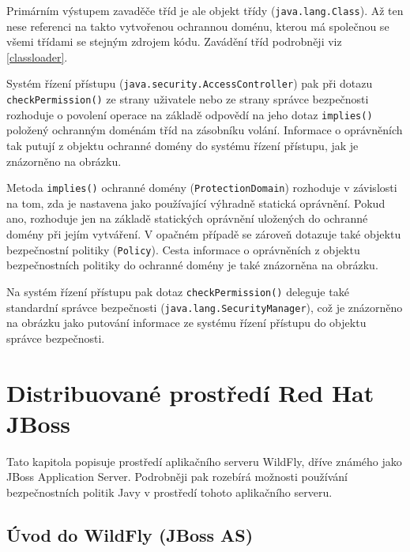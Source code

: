 Primárním výstupem zavaděče tříd je ale objekt třídy ({\tt java.lang.Class}).
Až ten nese referenci na takto vytvořenou ochrannou doménu, kterou má společnou se všemi třídami se stejným zdrojem kódu.
Zavádění tříd podrobněji viz \ref{classloader}.

Systém řízení přístupu ({\tt java.security.AccessController}) pak při dotazu {\tt checkPermission()} ze strany uživatele nebo ze strany správce bezpečnosti rozhoduje o povolení operace na základě odpovědí na jeho dotaz {\tt implies()} položený ochranným doménám tříd na zásobníku volání.
Informace o oprávněních tak putují z objektu ochranné domény do systému řízení přístupu, jak je znázorněno na obrázku.

Metoda {\tt implies()} ochranné domény ({\tt ProtectionDomain}) rozhoduje v závislosti na tom, zda je nastavena jako používající výhradně statická oprávnění.
Pokud ano, rozhoduje jen na základě statických oprávnění uložených do ochranné domény při jejím vytváření.
V opačném případě se zároveň dotazuje také objektu bezpečnostní politiky ({\tt Policy}).
Cesta informace o oprávněních z objektu bezpečnostních politiky do ochranné domény je také znázorněna na obrázku.

Na systém řízení přístupu pak dotaz {\tt checkPermission()} deleguje také standardní správce bezpečnosti ({\tt java.lang.SecurityManager}), což je znázorněno na obrázku jako putování informace ze systému řízení přístupu do objektu správce bezpečnosti.


\chapter{Distribuované prostředí Red Hat JBoss} \label{jboss}

Tato kapitola popisuje prostředí aplikačního serveru WildFly, dříve známého jako JBoss Application Server.
Podrobněji pak rozebírá možnosti používání bezpečnostních politik Javy v prostředí tohoto aplikačního serveru.

\section{Úvod do WildFly (JBoss AS)} \label{uvodWildFly}

